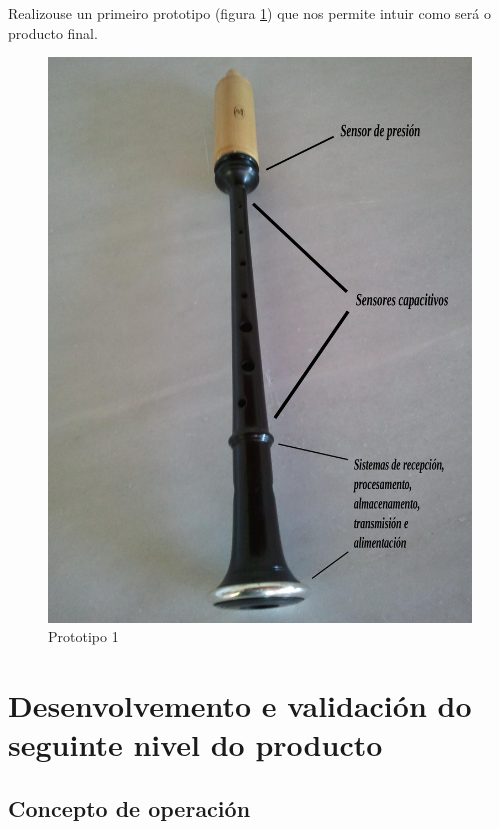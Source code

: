  Realizouse un primeiro prototipo (figura \ref{figura:Prototipo1}) que nos
 permite intuir como será o producto final.

 \begin{figure}[htbp]
  \centering
  \includegraphics[scale=0.15,keepaspectratio=true]{./imagenes/prototipo1.png}
  \caption{Prototipo 1}
  \label{figura:Prototipo1}
 \end{figure}

\section{Desenvolvemento e validación do seguinte nivel do producto}

 \subsection{Concepto de operación}

